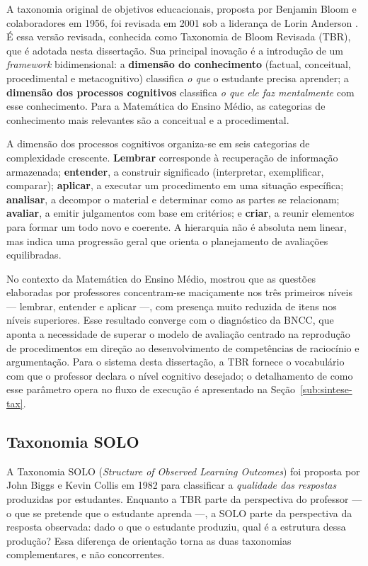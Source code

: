 A taxonomia original de objetivos educacionais, proposta por Benjamin Bloom e colaboradores em 1956,
foi revisada em 2001 sob a liderança de Lorin Anderson \citep{anderson2001taxonomy}. É essa versão
revisada, conhecida como Taxonomia de Bloom Revisada (TBR), que é adotada nesta dissertação. Sua
principal inovação é a introdução de um \emph{framework} bidimensional: a \textbf{dimensão do
conhecimento} (factual, conceitual, procedimental e metacognitivo) classifica \emph{o que} o estudante
precisa aprender; a \textbf{dimensão dos processos cognitivos} classifica \emph{o que ele faz
mentalmente} com esse conhecimento. Para a Matemática do Ensino Médio, as categorias de conhecimento
mais relevantes são a conceitual e a procedimental.

A dimensão dos processos cognitivos organiza-se em seis categorias de complexidade crescente.
\textbf{Lembrar} corresponde à recuperação de informação armazenada; \textbf{entender}, a construir
significado (interpretar, exemplificar, comparar); \textbf{aplicar}, a executar um procedimento em uma
situação específica; \textbf{analisar}, a decompor o material e determinar como as partes se
relacionam; \textbf{avaliar}, a emitir julgamentos com base em critérios; e \textbf{criar}, a reunir
elementos para formar um todo novo e coerente. A hierarquia não é absoluta nem linear, mas indica uma
progressão geral que orienta o planejamento de avaliações equilibradas.

No contexto da Matemática do Ensino Médio, \citet{miranda2015taxonomia} mostrou que as questões
elaboradas por professores concentram-se maciçamente nos três primeiros níveis --- lembrar, entender e
aplicar ---, com presença muito reduzida de itens nos níveis superiores. Esse resultado converge com o
diagnóstico da BNCC, que aponta a necessidade de superar o modelo de avaliação centrado na reprodução
de procedimentos em direção ao desenvolvimento de competências de raciocínio e argumentação. Para o
sistema desta dissertação, a TBR fornece o vocabulário com que o professor declara o nível cognitivo
desejado; o detalhamento de como esse parâmetro opera no fluxo de execução é apresentado na
Seção~\ref{sub:sintese-tax}.

\subsection{Taxonomia SOLO}
\label{sub:solo}

A Taxonomia SOLO (\emph{Structure of Observed Learning Outcomes}) foi proposta por John Biggs e Kevin
Collis em 1982 \citep{biggs1982solo} para classificar a \emph{qualidade das respostas} produzidas por
estudantes. Enquanto a TBR parte da perspectiva do professor --- o que se pretende que o estudante
aprenda ---, a SOLO parte da perspectiva da resposta observada: dado o que o estudante produziu, qual é
a estrutura dessa produção? Essa diferença de orientação torna as duas taxonomias complementares, e não
concorrentes.

